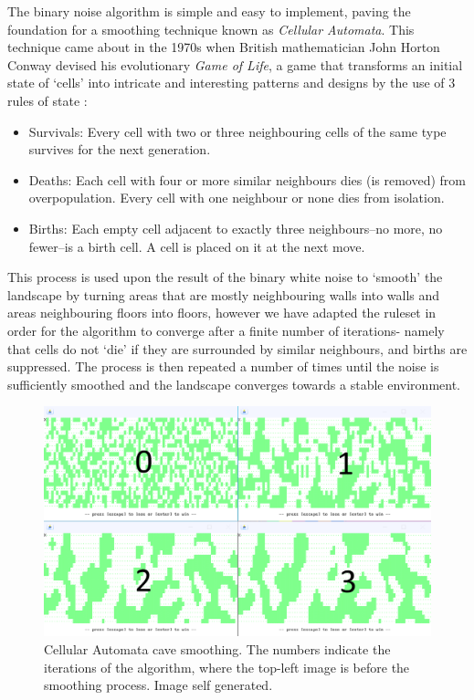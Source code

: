 \documentclass[12pt,a4paper]{article}
\begin{document}
The binary noise algorithm is simple and easy to implement, paving the foundation for a smoothing technique known as \emph{Cellular Automata}. This technique came about in the 1970s when British mathematician John Horton Conway devised his evolutionary \emph{Game of Life}, a game that transforms an initial state of `cells' into intricate and interesting patterns and designs by the use of 3 rules of state \cite{cellauto}:

\begin{itemize}
	\item Survivals: Every cell with two or three neighbouring cells of the same type survives for the next generation.
	\item Deaths: Each cell with four or more similar neighbours dies (is removed) from overpopulation. Every cell with one neighbour or none dies from isolation.
	\item Births: Each empty cell adjacent to exactly three neighbours--no more, no fewer--is a birth cell. A cell is placed on it at the next move.
\end{itemize}

This process is used upon the result of the binary white noise to `smooth' the landscape by turning areas that are mostly neighbouring walls into walls and areas neighbouring floors into floors, however we have adapted the ruleset in order for the algorithm to converge after a finite number of iterations- namely that cells do not `die' if they are surrounded by similar neighbours, and births are suppressed. The process is then repeated a number of times until the noise is sufficiently smoothed and the landscape converges towards a stable environment. 

\begin{figure}[ht]
  \centering
 	\includegraphics[scale=0.5]{images/cellauto.png}
	\caption[]{Cellular Automata cave smoothing. The numbers indicate the iterations of the algorithm, where the top-left image is before the smoothing process. Image self generated.}
	\label{fig:2}
\end{figure} 
\end{document}

